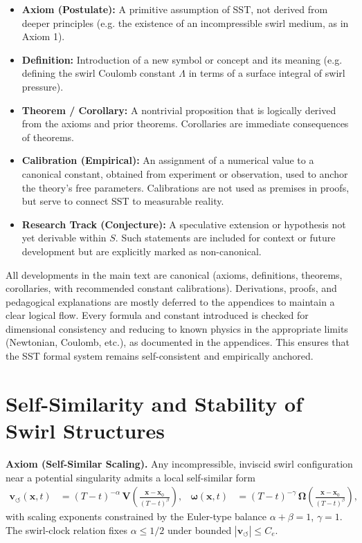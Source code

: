 \documentclass[10pt,reprint,aps,onecolumn,nofootinbib]{revtex4-2}
\begin{document}
	\begin{itemize}
	    \item \textbf{Axiom (Postulate):} A primitive assumption of SST, not derived from deeper principles (e.g. the existence of an incompressible swirl medium, as in Axiom 1).
	    \item \textbf{Definition:} Introduction of a new symbol or concept and its meaning (e.g. defining the swirl Coulomb constant $\Lambda$ in terms of a surface integral of swirl pressure).
	    \item \textbf{Theorem / Corollary:} A nontrivial proposition that is logically derived from the axioms and prior theorems. Corollaries are immediate consequences of theorems.
	    \item \textbf{Calibration (Empirical):} An assignment of a numerical value to a canonical constant, obtained from experiment or observation, used to anchor the theory’s free parameters. Calibrations are not used as premises in proofs, but serve to connect SST to measurable reality.
	    \item \textbf{Research Track (Conjecture):} A speculative extension or hypothesis not yet derivable within $S$. Such statements are included for context or future development but are explicitly marked as non-canonical.
	\end{itemize}

	All developments in the main text are canonical (axioms, definitions, theorems, corollaries, with recommended constant calibrations). Derivations, proofs, and pedagogical explanations are mostly deferred to the appendices to maintain a clear logical flow. Every formula and constant introduced is checked for dimensional consistency and reducing to known physics in the appropriate limits (Newtonian, Coulomb, etc.), as documented in the appendices. This ensures that the SST formal system remains self-consistent and empirically anchored.


    \section{Self-Similarity and Stability of Swirl Structures}
    \label{sec:self-similarity}

    \textbf{Axiom (Self-Similar Scaling).}
    Any incompressible, inviscid swirl configuration near a potential singularity admits a local
    self-similar form
    \begin{align}
        \mathbf{v}_{\!\boldsymbol{\circlearrowleft}}(\mathbf{x},t)
        &= (T-t)^{-\alpha}\,
        \mathbf{V}\!\left(\frac{\mathbf{x}-\mathbf{x}_0}{(T-t)^{\beta}}\right),
        &
        \boldsymbol{\omega}(\mathbf{x},t)
        &= (T-t)^{-\gamma}\,
        \boldsymbol{\Omega}\!\left(\frac{\mathbf{x}-\mathbf{x}_0}{(T-t)^{\beta}}\right),
    \end{align}
    with scaling exponents constrained by the Euler-type balance
    $\alpha+\beta=1$, $\gamma=1$.  The swirl-clock relation fixes
    \(\alpha \le 1/2\) under bounded
    \(|\mathbf{v}_{\!\boldsymbol{\circlearrowleft}}|\le C_e\).
\end{document}
